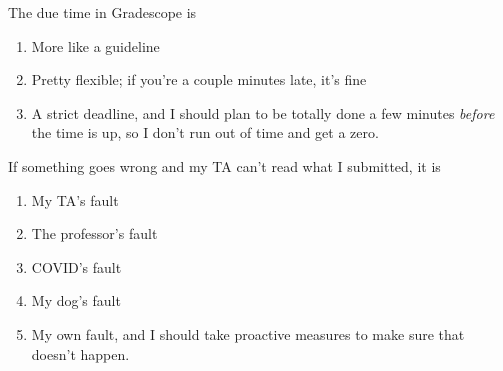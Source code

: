 \documentclass[12pt]{article}
\begin{document}
\begin{enumerate}
\Problem The due time in Gradescope is
	\begin{enumerate}
	\item More like a guideline
	\item Pretty flexible; if you're a couple minutes late, it's fine
	\item A strict deadline, and I should plan to be totally done a few minutes \emph{before} the time is up, so I don't run out of time and get a zero.
	\end{enumerate}
\vspace*{24pt}

\Problem If something goes wrong and my TA can't read what I submitted, it is
	\begin{enumerate}
	\item My TA's fault
	\item The professor's fault
	\item COVID's fault
	\item My dog's fault
	\item My own fault, and I should take proactive measures to make sure that doesn't happen. 
	\end{enumerate}
\vspace*{24pt}



\end{enumerate}
\end{document}
